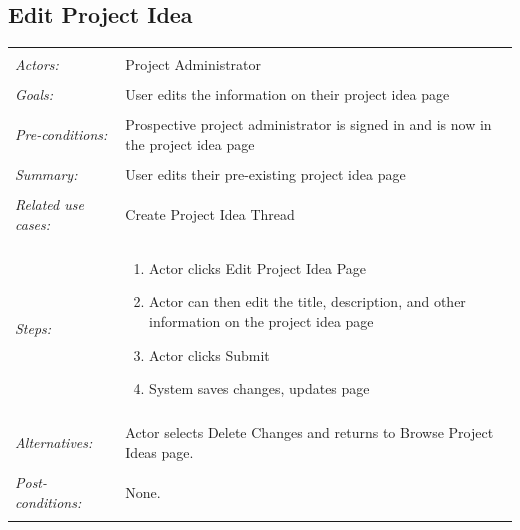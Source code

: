 \documentclass[11pt]{report}
\begin{document}
\subsection{Edit Project Idea }
\begin{tabular}{ p{2cm} p{12cm} }
 \hline
 \\
 \textit{Actors:} & Project Administrator \\ 
 \\
 \textit{Goals:} & User edits the information on their project idea page \\
 \\
 \textit{Pre-conditions:} & Prospective project administrator is signed in and is now in the project idea page \\
 \\
 \textit{Summary:} &  User edits their pre-existing project idea page \\ 
 \\
 \textit{Related use cases:} & Create Project Idea Thread \\ 
 \\
 \textit{Steps:} & \begin{enumerate}
  \item Actor clicks Edit Project Idea Page
  \item Actor can then edit the title, description, and other information on the project idea page
  \item Actor clicks Submit
  \item System saves changes, updates page
  
 \end{enumerate} \\
 \\
 \textit{Alternatives:} & Actor selects Delete Changes and returns to Browse Project Ideas page. \\
 \\
 \textit{Post-conditions:} & None. \\
 \\
\hline
\end{tabular}
\end{document}
